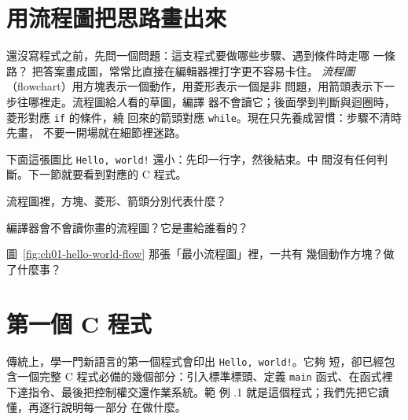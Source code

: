 \section{用流程圖把思路畫出來}
\label{sec:intro-flowchart}

還沒寫程式之前，先問一個問題：這支程式要做哪些步驟、遇到條件時走哪
一條路？ 把答案畫成圖，常常比直接在編輯器裡打字更不容易卡住。
\emph{流程圖}（flowchart）用方塊表示一個動作，用菱形表示一個是非
問題，用箭頭表示下一步往哪裡走。流程圖給\emph{人}看的草圖，編譯
器不會讀它；後面學到判斷與迴圈時，菱形對應 \texttt{if} 的條件，繞
回來的箭頭對應 \texttt{while}。現在只先養成習慣：步驟不清時先畫，
不要一開場就在細節裡迷路。

下面這張圖比 \texttt{Hello, world!} 還小：先印一行字，然後結束。中
間沒有任何判斷。下一節就要看到對應的 C 程式。

\begin{center}
\label{fig:ch01-hello-world-flow}
\end{center}


\begin{drills}[label=drills:intro-flowchart]
\item 流程圖裡，方塊、菱形、箭頭分別代表什麼？
\item 編譯器會不會讀你畫的流程圖？它是畫給誰看的？
\item 圖~\ref{fig:ch01-hello-world-flow} 那張「最小流程圖」裡，一共有
幾個動作方塊？做了什麼事？
\end{drills}

\section{第一個 C 程式}
\label{sec:intro-first-program}

傳統上，學一門新語言的第一個程式會印出 \texttt{Hello, world!}。它夠
短，卻已經包含一個完整 C 程式必備的幾個部分：引入標準標頭、定義
\texttt{main} 函式、在函式裡下達指令、最後把控制權交還作業系統。範
例 \thechapter.1 就是這個程式；我們先把它讀懂，再逐行說明每一部分
在做什麼。


